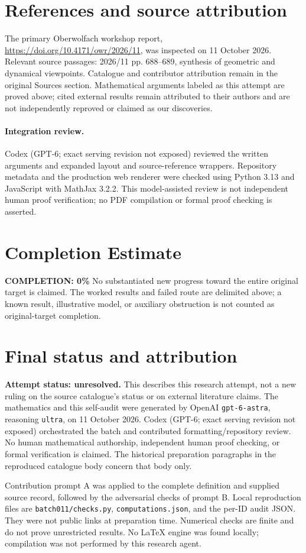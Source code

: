 \documentclass[11pt]{article}
\begin{document}
\section{References and source attribution}
The primary Oberwolfach workshop report, \url{https://doi.org/10.4171/owr/2026/11}, was inspected on 11 October 2026. Relevant source passages: 2026/11 pp. 688--689, synthesis of geometric and dynamical viewpoints. Catalogue and contributor attribution remain in the original Sources section. Mathematical arguments labeled as this attempt are proved above; cited external results remain attributed to their authors and are not independently reproved or claimed as our discoveries.


\paragraph{Integration review.} Codex (GPT-6; exact serving revision not exposed) reviewed the written arguments and expanded layout and source-reference wrappers. Repository metadata and the production web renderer were checked using Python 3.13 and JavaScript with MathJax 3.2.2. This model-assisted review is not independent human proof verification; no PDF compilation or formal proof checking is asserted.

\section{Completion Estimate}
\noindent\textbf{COMPLETION: 0\%}
No substantiated new progress toward the entire original target is claimed. The worked results and failed route are delimited above; a known result, illustrative model, or auxiliary obstruction is not counted as original-target completion.

\section{Final status and attribution}
\textbf{Attempt status: unresolved.} This describes this research attempt, not a new ruling on the source catalogue's status or on external literature claims.
The mathematics and this self-audit were generated by OpenAI \texttt{gpt-6-astra}, reasoning \texttt{ultra}, on 11 October 2026. Codex (GPT-6; exact serving revision not exposed) orchestrated the batch and contributed formatting/repository review. No human mathematical authorship, independent human proof checking, or formal verification is claimed. The historical preparation paragraphs in the reproduced catalogue body concern that body only.

Contribution prompt A was applied to the complete definition and supplied source record, followed by the adversarial checks of prompt B. Local reproduction files are \texttt{batch011/checks.py}, \texttt{computations.json}, and the per-ID audit JSON. They were not public links at preparation time. Numerical checks are finite and do not prove unrestricted results. No LaTeX engine was found locally; compilation was not performed by this research agent.
\end{document}
